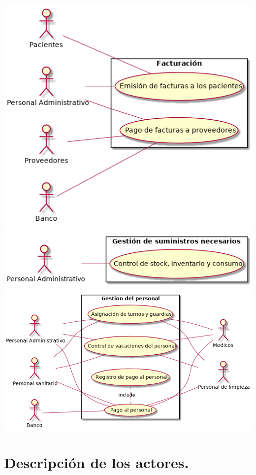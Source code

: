 \documentclass[10pt,a4paper,spanish]{report}
\begin{document}
\begin{center}
	\includegraphics[scale=0.5]{Facturacion}\\
	\includegraphics[scale=0.5]{Gestion_de_suministros_necesarios}\\
	\includegraphics[scale=0.5]{Gestion_del_personal}\\
\end{center}


\section*{Descripción de los actores.}
\end{document}
